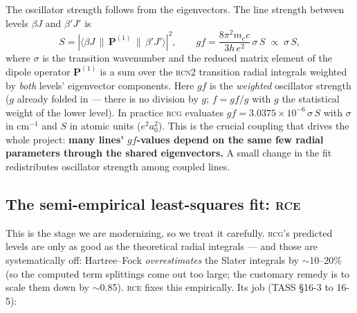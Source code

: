\documentclass[11pt]{article}
\newcommand{\prog}[1]{\textsc{#1}}
\begin{document}
The oscillator strength follows from the eigenvectors. The line strength between
levels $\beta J$ and $\beta' J'$ is
\begin{equation}
S = \left| \langle \beta J \,\|\, \mathbf{P}^{(1)} \,\|\, \beta' J'\rangle \right|^2 ,
\qquad
gf = \frac{8\pi^2 m_e c}{3 h\,e^2}\,\sigma\, S \;\propto\; \sigma\, S,
\end{equation}
where $\sigma$ is the transition wavenumber and the reduced matrix element of
the dipole operator $\mathbf{P}^{(1)}$ is a sum over the \prog{rcn2} transition
radial integrals weighted by \emph{both} levels' eigenvector components. Here
$gf$ is the \emph{weighted} oscillator strength ($g$ already folded in --- there
is no division by $g$; $f=gf/g$ with $g$ the statistical weight of the lower
level). In practice \prog{rcg} evaluates $gf = 3.0375\times10^{-6}\,\sigma\,S$
with $\sigma$ in $\mathrm{cm^{-1}}$ and $S$ in atomic units ($e^2a_0^2$). This is the
crucial coupling that drives the whole project: \textbf{many lines' $gf$-values
depend on the same few radial parameters through the shared eigenvectors.} A
small change in the fit redistributes oscillator strength among coupled lines.

\subsection{The semi-empirical least-squares fit: \prog{rce}}
\label{sec:rce}

This is the stage we are modernizing, so we treat it carefully. \prog{rcg}'s
predicted levels are only as good as the theoretical radial integrals --- and
those are systematically off: Hartree--Fock \emph{overestimates} the Slater
integrals by $\sim$10--20\% (so the computed term splittings come out too large;
the customary remedy is to scale them down by $\sim$0.85). \prog{rce} fixes this
empirically. Its job (TASS \S16-3 to 16-5):
\end{document}
